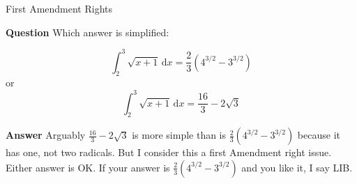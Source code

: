 \documentclass[fleqn]{beamer}
\theoremstyle{definition}
\begin{document}
\begin{frame}{First Amendment Rights}

\textbf{Question} Which answer is simplified:

\begin{equation*}
    \int_2^3 \sqrt{x+1} \, \mathrm{d}x =  \frac{2}{3} \left(4^{3/2} - 3^{3/2}\right)
\end{equation*}
or 
\begin{equation*}
    \int_2^3 \sqrt{x+1} \, \mathrm{d}x =  \frac{16}{3} - 2 \sqrt{3}
\end{equation*}

\textbf{Answer} Arguably $\frac{16}{3} - 2 \sqrt{3}$ is more simple 
than is $\frac{2}{3} \left(4^{3/2} - 3^{3/2}\right)$ because it 
has one, not two radicals. But I consider this a first Amendment 
right issue. Either answer is OK. If your answer is $\frac{2}{3} \left(4^{3/2} - 3^{3/2}\right)$
and you like it, I say LIB.
\end{frame}
    
\end{document}

